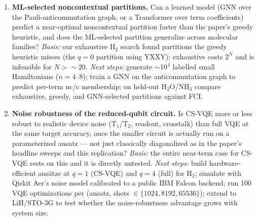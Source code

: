 \begin{enumerate}
\item \textbf{ML-selected noncontextual partitions.} Can a learned
model (GNN over the Pauli-anticommutation graph, or a Transformer over
term coefficients) predict a near-optimal noncontextual partition
faster than the paper's greedy heuristic, and does the ML-selected
partition generalize across molecular families? \emph{Basis:} our
exhaustive H$_2$ search found partitions the greedy heuristic misses
(the $q\!=\!0$ partition using YXXY); exhaustive costs $2^N$ and is
infeasible for $N\!>\!\sim\!20$. \emph{Next steps:} generate $\sim$10$^4$
labelled small Hamiltonians ($n\!=\!4$--$8$); train a GNN on the
anticommutation graph to predict per-term nc/c membership; on
held-out H$_2$O/NH$_3$ compare exhaustive, greedy, and GNN-selected
partitions against FCI.

\item \textbf{Noise robustness of the reduced-qubit circuit.} Is
CS-VQE more or less robust to realistic device noise (T$_1$/T$_2$,
readout, crosstalk) than full VQE at the same target accuracy, once
the smaller circuit is actually run on a parameterized ansatz --- not
just classically diagonalized as in the paper's headline sweeps and
this replication? \emph{Basis:} the entire near-term case for CS-VQE
rests on this and it is directly untested. \emph{Next steps:} build
hardware-efficient ansätze at $q\!=\!1$ (CS-VQE) and $q\!=\!4$ (full)
for H$_2$; simulate with Qiskit Aer's noise model calibrated to a
public IBM Falcon backend; run 100 VQE optimizations per (ansatz,
shots $\in\{1024, 8192, 65536\}$); extend to LiH/STO-3G to test whether
the noise-robustness advantage grows with system size.

\end{enumerate}
